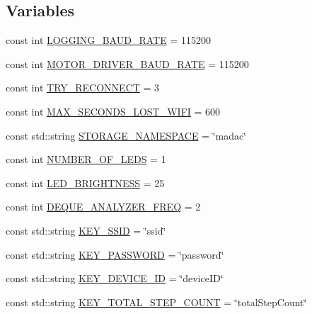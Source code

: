 \subsection*{Variables}
\begin{DoxyCompactItemize}
\item 
const int \hyperlink{namespaceCONFIG__SET_aa9d9cee85d0c1416ccb5ed5f801de6db}{L\+O\+G\+G\+I\+N\+G\+\_\+\+B\+A\+U\+D\+\_\+\+R\+A\+TE} = 115200
\item 
const int \hyperlink{namespaceCONFIG__SET_a7db23e13f6ec09a9be65fad30733470e}{M\+O\+T\+O\+R\+\_\+\+D\+R\+I\+V\+E\+R\+\_\+\+B\+A\+U\+D\+\_\+\+R\+A\+TE} = 115200
\item 
const int \hyperlink{namespaceCONFIG__SET_a0d526cb827f2f3c5236874a4157448af}{T\+R\+Y\+\_\+\+R\+E\+C\+O\+N\+N\+E\+CT} = 3
\item 
const int \hyperlink{namespaceCONFIG__SET_a4a1488bbde32db8f3d362761adc7c637}{M\+A\+X\+\_\+\+S\+E\+C\+O\+N\+D\+S\+\_\+\+L\+O\+S\+T\+\_\+\+W\+I\+FI} = 600
\item 
const std\+::string \hyperlink{namespaceCONFIG__SET_adc424e5a5b81f2016a88456fd2f383d9}{S\+T\+O\+R\+A\+G\+E\+\_\+\+N\+A\+M\+E\+S\+P\+A\+CE} = \char`\"{}madac\char`\"{}
\item 
const int \hyperlink{namespaceCONFIG__SET_a91d987372150d727ecbb41b39d482911}{N\+U\+M\+B\+E\+R\+\_\+\+O\+F\+\_\+\+L\+E\+DS} = 1
\item 
const int \hyperlink{namespaceCONFIG__SET_ae380133af7dbc440e94dd1d32ca8011c}{L\+E\+D\+\_\+\+B\+R\+I\+G\+H\+T\+N\+E\+SS} = 25
\item 
const int \hyperlink{namespaceCONFIG__SET_af30cde25aaad1a3f7c1056df78fe44ef}{D\+E\+Q\+U\+E\+\_\+\+A\+N\+A\+L\+Y\+Z\+E\+R\+\_\+\+F\+R\+EQ} = 2
\item 
const std\+::string \hyperlink{namespaceCONFIG__SET_adc315222607c5e3c4aa1e0d13b6987ee}{K\+E\+Y\+\_\+\+S\+S\+ID} = \char`\"{}ssid\char`\"{}
\item 
const std\+::string \hyperlink{namespaceCONFIG__SET_a19f24640ed129493b066d05e146deaf3}{K\+E\+Y\+\_\+\+P\+A\+S\+S\+W\+O\+RD} = \char`\"{}password\char`\"{}
\item 
const std\+::string \hyperlink{namespaceCONFIG__SET_af0e474e6061134d6cbf04e0c890552d9}{K\+E\+Y\+\_\+\+D\+E\+V\+I\+C\+E\+\_\+\+ID} = \char`\"{}device\+ID\char`\"{}
\item 
const std\+::string \hyperlink{namespaceCONFIG__SET_acb991fe6c1317a4bf770b8b1a049ad25}{K\+E\+Y\+\_\+\+T\+O\+T\+A\+L\+\_\+\+S\+T\+E\+P\+\_\+\+C\+O\+U\+NT} = \char`\"{}total\+Step\+Count\char`\"{}

\end{DoxyCompactItemize}
